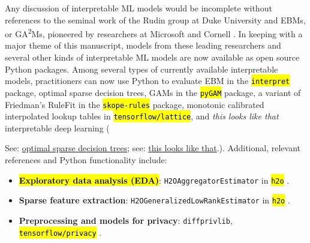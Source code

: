 \documentclass[information,article,accept,moreauthors,pdftex]{Definitions/mdpi}
\begin{document}
{{Any discussion of interpretable ML models would be incomplete without references to the seminal work of the Rudin group at Duke University  and EBMs, or GA\textsuperscript{2}Ms, pioneered by researchers at Microsoft and Cornell \cite{ga2m,osdt,this_looks_like_that}. In keeping with a major theme of this manuscript, models from these leading researchers and several other kinds of interpretable ML models are now available as open source Python packages. Among several types of currently available interpretable models, practitioners can now use Python to evaluate EBM in the  %
{\texttt{\hl{interpret}}} package, optimal sparse decision trees, GAMs in the 
{\texttt{\hl{pyGAM}}} package, a variant of Friedman's RuleFit  in the 
{\texttt{\hl{skope-rules}}} package, monotonic calibrated interpolated lookup tables in 
{\texttt{\hl{tensorflow/lattice}}}, and \textit{this looks like that} interpretable deep learning \cite{osdt,rulefit,lattice,this_looks_like_that} ({See: 
\href{https://github.com/xiyanghu/OSDT}{optimal sparse decision trees}; see: 
\href{https://github.com/cfchen-duke/ProtoPNet}{this looks like that}.). Additional, relevant references and Python functionality include:

\begin{itemize}[leftmargin=*,labelsep=5.8mm]%

\item \textbf{\hl{Exploratory data analysis (EDA)}}: \texttt{H2OAggregatorEstimator} in 
{\texttt{\hl{h2o}}} \cite{wilkinson2018visualizing}.

\item \textbf{Sparse feature extraction}: \texttt{H2OGeneralizedLowRankEstimator} in 
{\texttt{\hl{h2o}}} \cite{udell2016generalized}.

\item \textbf{Preprocessing and models for privacy}: 
{\texttt{diffprivlib}}, 
{\texttt{\hl{tensorflow/privacy}}} \cite{diffprivlib,ji2014differential,pate,abadi2016deep}.


\end{itemize}}}}
\end{document}
